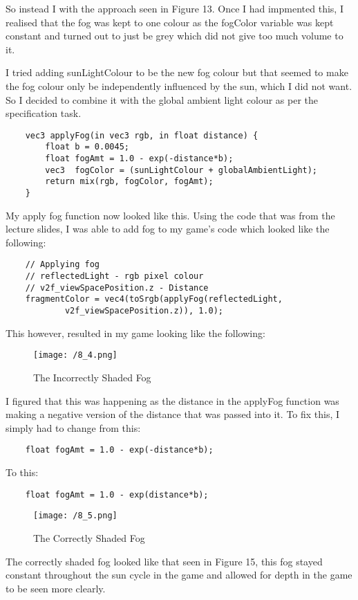 \documentclass[11pt, oneside, a4paper]{article}
\begin{document}
So instead I with the approach seen in Figure 13. Once I had impmented this, I realised that the fog was kept to one colour as the fogColor variable was kept constant and turned out to just be grey which did not give too much volume to it. 

I tried adding sunLightColour to be the new fog colour but that seemed to make the fog colour only be independently influenced by the sun, which I did not want. So I decided to combine it with the global ambient light colour as per the specification task.

\begin{lstlisting}
    vec3 applyFog(in vec3 rgb, in float distance) {
        float b = 0.0045; 
        float fogAmt = 1.0 - exp(-distance*b);
        vec3  fogColor = (sunLightColour + globalAmbientLight);
        return mix(rgb, fogColor, fogAmt);
    }
\end{lstlisting}

My apply fog function now looked like this. Using the code that was from the lecture slides, I was able to add fog to my game's code which looked like the following:

\begin{lstlisting}
    // Applying fog
    // reflectedLight - rgb pixel colour
    // v2f_viewSpacePosition.z - Distance
    fragmentColor = vec4(toSrgb(applyFog(reflectedLight,
            v2f_viewSpacePosition.z)), 1.0);
\end{lstlisting}

This however, resulted in my game looking like the following:
\begin{figure}[!ht]
	\centerline{\texttt{[image: /8\_4.png]}}
	\caption{The Incorrectly Shaded Fog}
	\label{fig:figure14}
\end{figure}

\newpage
I figured that this was happening as the distance in the applyFog function was making a negative version of the distance that was passed into it. To fix this, I simply had to change from this:
\begin{lstlisting}
    float fogAmt = 1.0 - exp(-distance*b);
\end{lstlisting}
To this:
\begin{lstlisting}
    float fogAmt = 1.0 - exp(distance*b);
\end{lstlisting}

\begin{figure}[!ht]
	\centerline{\texttt{[image: /8\_5.png]}}
	\caption{The Correctly Shaded Fog}
	\label{fig:figure15}
\end{figure}
The correctly shaded fog looked like that seen in Figure 15, this fog stayed constant throughout the sun cycle in the game and allowed for depth in the game to be seen more clearly.
\end{document}
